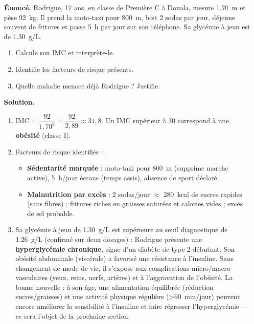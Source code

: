 \documentclass[11pt]{article}
\begin{document}
\begin{exoresolu}
\textbf{Énoncé.} Rodrigue, 17 ans, en classe de Première C à Douala, mesure \SI{1,70}{m} et pèse \SI{92}{kg}. Il prend la moto-taxi pour \SI{800}{m}, boit 2 sodas par jour, déjeune souvent de fritures et passe \SI{5}{h} par jour sur son téléphone. Sa glycémie à jeun est de \SI{1,30}{g/L}. 
\begin{enumerate}
\item Calcule son IMC et interprète-le.
\item Identifie les facteurs de risque présents.
\item Quelle maladie menace déjà Rodrigue ? Justifie.
\end{enumerate}
\tcblower
\textbf{Solution.}
\begin{enumerate}
\item $\text{IMC} = \dfrac{92}{1,70^2} = \dfrac{92}{2,89} \approx 31,8$. Un IMC supérieur à 30 correspond à une \textbf{obésité} (classe I).
\item Facteurs de risque identifiés : 
\begin{itemize}
    \item \textbf{Sédentarité marquée} : moto-taxi pour \SI{800}{m} (supprime marche active), \SI{5}{h}/jour écrans (temps assis), absence de sport déclaré.
    \item \textbf{Malnutrition par excès} : 2 sodas/jour $\approx$ \SI{280}{kcal} de sucres rapides (sans fibres) ; fritures riches en graisses saturées et calories vides ; excès de sel probable.
\end{itemize}
\item Sa glycémie à jeun de \SI{1,30}{g/L} est supérieure au seuil diagnostique de \SI{1,26}{g/L} (confirmé sur deux dosages) : Rodrigue présente une \textbf{hyperglycémie chronique}, signe d'un diabète de type 2 débutant. Son obésité abdominale (viscérale) a favorisé une résistance à l'insuline. Sans changement de mode de vie, il s'expose aux complications micro/macro-vasculaires (yeux, reins, nerfs, artères) et à l'aggravation de l'obésité. La bonne nouvelle : à son âge, une alimentation équilibrée (réduction sucres/graisses) et une activité physique régulière (\textgreater \SI{60}{min}/jour) peuvent encore améliorer la sensibilité à l'insuline et faire régresser l'hyperglycémie — ce sera l'objet de la prochaine section.
\end{enumerate}
\end{exoresolu}
\end{document}
